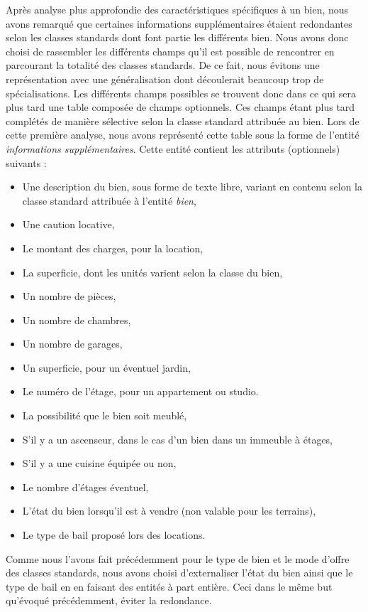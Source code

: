 Après analyse plus approfondie des caractéristiques spécifiques à un bien, nous avons remarqué que certaines informations supplémentaires étaient redondantes selon les classes standards dont font partie les différents bien. Nous avons donc choisi de rassembler les différents champs qu'il est possible de rencontrer en parcourant la totalité des classes standards. De ce fait, nous évitons une représentation avec une généralisation dont découlerait beaucoup trop de spécialisations. Les différents champs possibles se trouvent donc dans ce qui sera plus tard une table composée de champs optionnels. Ces champs étant plus tard complétés de manière sélective selon la classe standard attribuée au bien. Lors de cette première analyse, nous avons représenté cette table sous la forme de l'entité \textit{informations supplémentaires}. Cette entité contient les attributs (optionnels) suivants : 
\begin{itemize}
	\item Une description du bien, sous forme de texte libre, variant en contenu selon la classe standard attribuée à l'entité \textit{bien},
	\item Une caution locative,
	\item Le montant des charges, pour la location,
	\item La superficie, dont les unités varient selon la classe du bien,
	\item Un nombre de pièces,
	\item Un nombre de chambres,
	\item Un nombre de garages,
	\item Un superficie, pour un éventuel jardin,
	\item Le numéro de l'étage, pour un appartement ou studio.
	\item La possibilité que le bien soit meublé,
	\item S'il y a un ascenseur, dans le cas d'un bien dans un immeuble à étages,
	\item S'il y a une cuisine équipée ou non,
	\item Le nombre d'étages éventuel,
	\item L'état du bien lorsqu'il est à vendre (non valable pour les terrains),
	\item Le type de bail proposé lors des locations.\\
\end{itemize}
Comme nous l'avons fait précédemment pour le type de bien et le mode d'offre des classes standards, nous avons choisi d'externaliser l'état du bien ainsi que le type de bail en en faisant des entités à part entière. Ceci dans le même but qu'évoqué précédemment, éviter la redondance.\\

